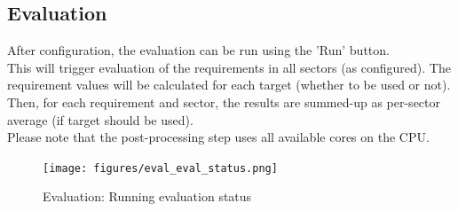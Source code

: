 

\subsection{Evaluation}
\label{sec:eval_run_eval} 

After configuration, the evaluation can be run using the 'Run' button. \\

This will trigger evaluation of the requirements in all sectors (as configured). 
The requirement values will be calculated for each target (whether to be used or not). 
Then, for each requirement and sector, the results are summed-up as per-sector average (if target should be used). \\

Please note that the post-processing step uses all available cores on the CPU.

\begin{figure}[H]
  \centering 
    \texttt{[image: figures/eval\_eval\_status.png]}
  \caption{Evaluation: Running evaluation status}
\end{figure}








